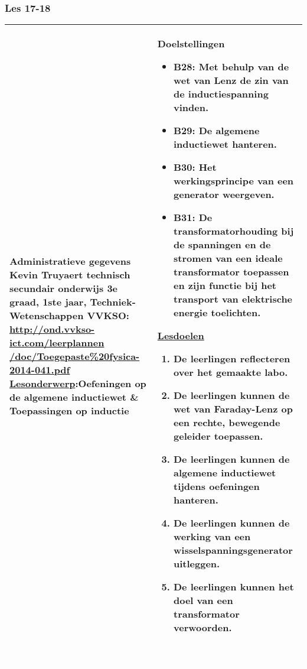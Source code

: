 


\begin{landscape}
	\subsubsection{Les 17-18}
	\begin{tabularx}{1.56\textwidth}{|p{}|X|}\hline
		\textbf{Administratieve gegevens}\newline\newline
		Kevin Truyaert\newline\newline
		technisch secundair onderwijs\newline
		3e graad, 1ste jaar, Techniek-Wetenschappen\newline
		VVKSO: \href{http://ond.vvkso-ict.com/leerplannen/doc/Toegepaste\%20fysica-2014-041.pdf}{http://ond.vvkso-ict.com/leerplannen /doc/Toegepaste\%20fysica-2014-041.pdf} \newline
		\underline{Lesonderwerp}:\newline Oefeningen op de algemene inductiewet \& Toepassingen op inductie & \textbf{Doelstellingen}
		\begin{itemize}[itemsep=0.08\baselineskip]
			\item B28: Met behulp van de wet van Lenz de zin van de inductiespanning vinden.
			\item B29: De algemene inductiewet hanteren.
			\item B30: Het werkingsprincipe van een generator weergeven.
			\item B31: De transformatorhouding bij de spanningen en de stromen van een ideale transformator toepassen en zijn functie bij het transport van elektrische energie toelichten.
		\end{itemize}
		\underline{Lesdoelen}\newline
		\vspace{-0.75cm}
		\begin{enumerate}[itemsep=0.08\baselineskip]
			\item De leerlingen reflecteren over het gemaakte labo.
			\item De leerlingen kunnen de wet van Faraday-Lenz op een rechte, bewegende geleider toepassen.
			\item De leerlingen kunnen de algemene inductiewet tijdens oefeningen hanteren.
			\item De leerlingen kunnen de werking van een wisselspanningsgenerator uitleggen.
			\item De leerlingen kunnen het doel van een transformator verwoorden.
		\end{enumerate} \\\hline
	\end{tabularx}\vfill \textcolor{white}{.} 



\end{landscape}
